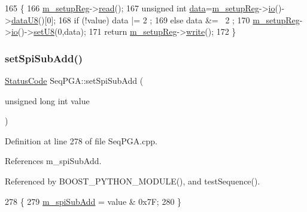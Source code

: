 \begin{DoxyCode}
165                                            \{
166   \hyperlink{classSeqPGA_a03269241e7fc26493cd0595beda334c2}{m\_setupReg}->\hyperlink{classIOobject_aa07610c11963b1db6710e3c76ceea456}{read}();
167   \textcolor{keywordtype}{unsigned} \textcolor{keywordtype}{int} \hyperlink{namespaceshell_a5ea2525995cedc3efd69ea8a7f034d1e}{data}=\hyperlink{classSeqPGA_a03269241e7fc26493cd0595beda334c2}{m\_setupReg}->\hyperlink{classIOobject_af04fb94137c3d86849f478ac5afab5d1}{io}()->\hyperlink{classIOdata_a75e9c318dbac3a39402179070943d4bc}{dataU8}()[0];
168   \textcolor{keywordflow}{if} (!value) data |=  2 ;
169   \textcolor{keywordflow}{else}        data &= ~2 ;
170   \hyperlink{classSeqPGA_a03269241e7fc26493cd0595beda334c2}{m\_setupReg}->\hyperlink{classIOobject_af04fb94137c3d86849f478ac5afab5d1}{io}()->\hyperlink{classIOdata_a6c4fb2f2af01889ada889c2b7aceb24d}{setU8}(0,data);
171   \textcolor{keywordflow}{return} \hyperlink{classSeqPGA_a03269241e7fc26493cd0595beda334c2}{m\_setupReg}->\hyperlink{classIOobject_a9f6984bc9f0fadcf800f1be2523ac744}{write}();
172 \}
\end{DoxyCode}
\mbox{\label{classSeqPGA_a5db205f213770dd3fb3fcfb8ff7981df}} 
\subsubsection{\texorpdfstring{set\+Spi\+Sub\+Add()}{setSpiSubAdd()}}
{\footnotesize\ttfamily \hyperlink{classStatusCode}{Status\+Code} Seq\+P\+G\+A\+::set\+Spi\+Sub\+Add (\begin{DoxyParamCaption}\item[{unsigned long int}]{value }\end{DoxyParamCaption})}



Definition at line 278 of file Seq\+P\+G\+A.\+cpp.



References m\+\_\+spi\+Sub\+Add.



Referenced by B\+O\+O\+S\+T\+\_\+\+P\+Y\+T\+H\+O\+N\+\_\+\+M\+O\+D\+U\+L\+E(), and test\+Sequence().


\begin{DoxyCode}
278                                                         \{
279   \hyperlink{classSeqPGA_afd5442d9b92f9b59bd553df9bd91dd87}{m\_spiSubAdd} = value & 0x7F;
280 \}
\end{DoxyCode}
\mbox{\label{classSeqPGA_a83598ab914c8e3ee5afa34c5e6e7fdf4}} 
